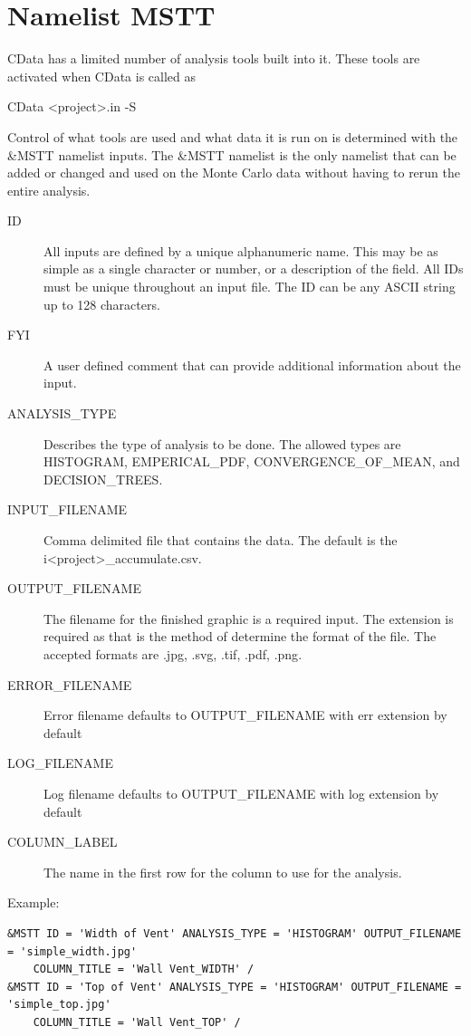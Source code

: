 \documentclass[12pt,twoside]{book}
\begin{document}
\section{Namelist MSTT}
\label{info:MSTT}

CData has a limited number of analysis tools built into it. These tools are activated when CData is called as

{\ct CData <project>.in -S}

Control of what tools are used and what data it is run on is determined with the {\ct \&MSTT} namelist inputs. The {\ct \&MSTT} namelist is the only namelist that can be added or changed and used on the Monte Carlo data without having to rerun the entire analysis.


\begin{description}
 \item[ID] All inputs are defined by a unique alphanumeric name. This may be as simple as a single character or number, or a description of the field. All IDs must be unique throughout an input file. The { \ct ID} can be any ASCII string up to 128 characters.
  \item[FYI] A user defined comment that can provide additional information about the input.
 \item[ANALYSIS\_TYPE] Describes the type of analysis to be done. The allowed types are {\ct HISTOGRAM}, {\ct EMPERICAL\_PDF}, {\ct CONVERGENCE\_OF\_MEAN}, and {\ct DECISION\_TREES}.
 \item[INPUT\_FILENAME] Comma delimited file that contains the data. The default is the {\ct i<project>\_accumulate.csv}.
 \item[OUTPUT\_FILENAME] The filename for the finished graphic is a required input. The extension is required as that is the method of determine the format of the file. The accepted formats are {\ct *.jpg}, {\ct *.svg}, {\ct *.tif}, {\ct *.pdf}, {\ct *.png}.
 \item[ERROR\_FILENAME] Error filename defaults to {\ct OUTPUT\_FILENAME} with {\ct err} extension by default
 \item[LOG\_FILENAME] Log filename defaults to {\ct OUTPUT\_FILENAME} with {\ct log} extension by default
 \item[COLUMN\_LABEL] The name in the first row for the column to use for the analysis.
\end{description}

\vspace{\baselineskip}
\noindent Example:
\begin{lstlisting}
&MSTT ID = 'Width of Vent' ANALYSIS_TYPE = 'HISTOGRAM' OUTPUT_FILENAME = 'simple_width.jpg'
	COLUMN_TITLE = 'Wall Vent_WIDTH' /
&MSTT ID = 'Top of Vent' ANALYSIS_TYPE = 'HISTOGRAM' OUTPUT_FILENAME = 'simple_top.jpg'
	COLUMN_TITLE = 'Wall Vent_TOP' /
\end{lstlisting}
\end{document}
